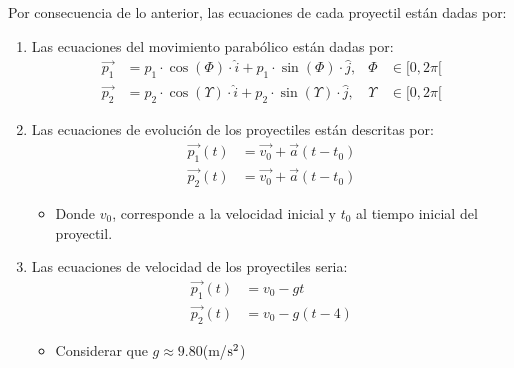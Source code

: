 \documentclass[12pt,tikz,border=3.14mm]{article}
\begin{document}
\begin{enumerate}[a),leftmargin=1cm]
\begin{itemize}
					Por consecuencia de lo anterior, las ecuaciones de cada proyectil están dadas por:
						\begin{enumerate}[1)]
							\item Las ecuaciones del movimiento parabólico están dadas por:
								\begin{align*}
									\vec{p_1} &= p_1 \cdot \cos(\Phi) \cdot \hat{i} + p_1 \cdot \sin(\Phi) \cdot \hat{j}, & \Phi & \in [0, 2\pi[ \\
									\vec{p_2} &= p_2 \cdot \cos(\Upsilon) \cdot \hat{i} + p_2 \cdot \sin(\Upsilon) \cdot \hat{j}, & \Upsilon & \in [0, 2\pi[ 
								\end{align*}
							\item Las ecuaciones de evolución de los proyectiles están descritas por: 
								\begin{align*}
									\vec{p_1}(t) &= \vec{v_0} + \vec{a}(t-t_0) \\
									\vec{p_2}(t) &= \vec{v_0} + \vec{a}(t-t_0)
								\end{align*}
									\begin{itemize}[leftmargin=1cm]
										\item Donde $v_0$, corresponde a la velocidad inicial y $t_0$ al tiempo inicial del proyectil.
									\end{itemize}
							\item Las ecuaciones de velocidad de los proyectiles seria:
								\begin{align*}
									\vec{p_1}(t) &= v_0 -gt \\
									\vec{p_2}(t) &= v_0-g(t-4)
								\end{align*}		
								
									\begin{itemize}[leftmargin=1cm]
										\item Considerar que $g \approx 9.80 $(m/$\rm{s}^{2}$)
									\end{itemize}																
						\end{enumerate}
						

\end{itemize}
\end{enumerate}
\end{document}
